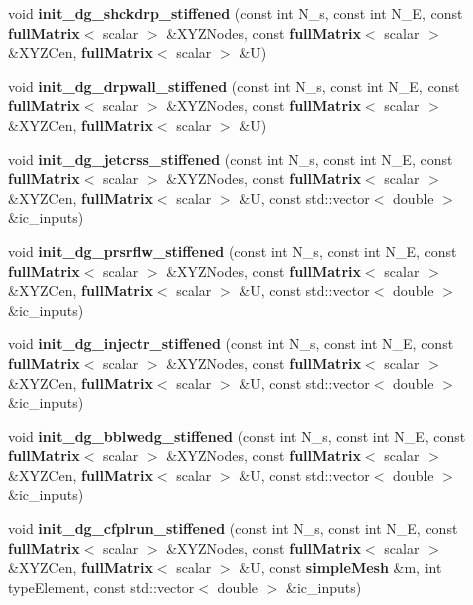 \begin{DoxyCompactItemize}
\item 
void {\bfseries init\-\_\-dg\-\_\-shckdrp\-\_\-stiffened} (const int N\-\_\-s, const int N\-\_\-\-E, const {\bf full\-Matrix}$<$ scalar $>$ \&X\-Y\-Z\-Nodes, const {\bf full\-Matrix}$<$ scalar $>$ \&X\-Y\-Z\-Cen, {\bf full\-Matrix}$<$ scalar $>$ \&U)\label{init__cond_8cc_aee31d4fe9ccac2b1d907ce05dfee61b4}

\item 
void {\bfseries init\-\_\-dg\-\_\-drpwall\-\_\-stiffened} (const int N\-\_\-s, const int N\-\_\-\-E, const {\bf full\-Matrix}$<$ scalar $>$ \&X\-Y\-Z\-Nodes, const {\bf full\-Matrix}$<$ scalar $>$ \&X\-Y\-Z\-Cen, {\bf full\-Matrix}$<$ scalar $>$ \&U)\label{init__cond_8cc_a54362f77ebdb9b7cdfdad70c50d8d06c}

\item 
void {\bfseries init\-\_\-dg\-\_\-jetcrss\-\_\-stiffened} (const int N\-\_\-s, const int N\-\_\-\-E, const {\bf full\-Matrix}$<$ scalar $>$ \&X\-Y\-Z\-Nodes, const {\bf full\-Matrix}$<$ scalar $>$ \&X\-Y\-Z\-Cen, {\bf full\-Matrix}$<$ scalar $>$ \&U, const std\-::vector$<$ double $>$ \&ic\-\_\-inputs)\label{init__cond_8cc_a88cab0ba810a2d1b36825ee04af791fc}

\item 
void {\bfseries init\-\_\-dg\-\_\-prsrflw\-\_\-stiffened} (const int N\-\_\-s, const int N\-\_\-\-E, const {\bf full\-Matrix}$<$ scalar $>$ \&X\-Y\-Z\-Nodes, const {\bf full\-Matrix}$<$ scalar $>$ \&X\-Y\-Z\-Cen, {\bf full\-Matrix}$<$ scalar $>$ \&U, const std\-::vector$<$ double $>$ \&ic\-\_\-inputs)\label{init__cond_8cc_a27cab5b1d501f3d89b9f0e230dce5271}

\item 
void {\bfseries init\-\_\-dg\-\_\-injectr\-\_\-stiffened} (const int N\-\_\-s, const int N\-\_\-\-E, const {\bf full\-Matrix}$<$ scalar $>$ \&X\-Y\-Z\-Nodes, const {\bf full\-Matrix}$<$ scalar $>$ \&X\-Y\-Z\-Cen, {\bf full\-Matrix}$<$ scalar $>$ \&U, const std\-::vector$<$ double $>$ \&ic\-\_\-inputs)\label{init__cond_8cc_acebfd54abd5c6801476402f6e8f7443c}

\item 
void {\bfseries init\-\_\-dg\-\_\-bblwedg\-\_\-stiffened} (const int N\-\_\-s, const int N\-\_\-\-E, const {\bf full\-Matrix}$<$ scalar $>$ \&X\-Y\-Z\-Nodes, const {\bf full\-Matrix}$<$ scalar $>$ \&X\-Y\-Z\-Cen, {\bf full\-Matrix}$<$ scalar $>$ \&U, const std\-::vector$<$ double $>$ \&ic\-\_\-inputs)\label{init__cond_8cc_a0a67f23ae766153c46982ac46f217bd4}

\item 
void {\bfseries init\-\_\-dg\-\_\-cfplrun\-\_\-stiffened} (const int N\-\_\-s, const int N\-\_\-\-E, const {\bf full\-Matrix}$<$ scalar $>$ \&X\-Y\-Z\-Nodes, const {\bf full\-Matrix}$<$ scalar $>$ \&X\-Y\-Z\-Cen, {\bf full\-Matrix}$<$ scalar $>$ \&U, const {\bf simple\-Mesh} \&m, int type\-Element, const std\-::vector$<$ double $>$ \&ic\-\_\-inputs)\label{init__cond_8cc_adaf51f0656407dc5f10fa19acf5a81e1}


\end{DoxyCompactItemize}
